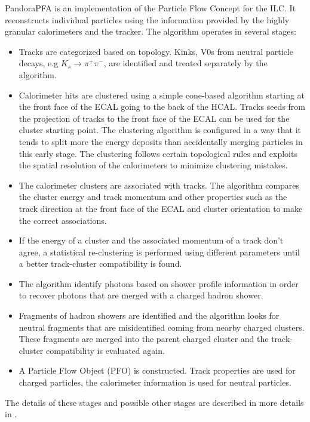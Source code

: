 PandoraPFA \cite{Thomson:2009rp, Marshall2013} is an implementation of the Particle Flow Concept for the ILC. It reconstructs individual particles using the information provided by the highly granular calorimeters and the tracker. The algorithm operates in several stages:
\begin{itemize}
  \item Tracks are categorized based on topology. Kinks, V0s from neutral particle decays, e.g $K_s \rightarrow \pi^+\pi^-$, are identified and treated separately by the algorithm.
  \item Calorimeter hits are clustered using a simple cone-based algorithm starting at the front face of the ECAL going to the back of the HCAL. Tracks seeds from the projection of tracks to the front face of the ECAL can be used for the cluster starting point. The clustering algorithm is configured in a way that it tends to split more the energy deposits than accidentally merging particles in this early stage. The clustering follows certain topological rules and exploits the spatial resolution of the calorimeters to minimize clustering mistakes.
  \item The calorimeter clusters are associated with tracks. The algorithm compares the cluster energy and track momentum and other properties such as the track direction at the front face of the ECAL and cluster orientation to make the correct associations.
  \item If the energy of a cluster and the associated momentum of a track don't agree, a statistical re-clustering is performed using different parameters until a better track-cluster compatibility is found.
  \item The algorithm identify photons based on shower profile information in order to recover photons that are merged with a charged hadron shower.
  \item Fragments of hadron showers are identified and the algorithm looks for neutral fragments that are misidentified coming from nearby charged clusters. These fragments are merged into the parent charged cluster and the track-cluster compatibility is evaluated again.
  \item A Particle Flow Object (PFO) is constructed. Track properties are used for charged particles, the calorimeter information is used for neutral particles.
\end{itemize}
The details of these stages and possible other stages are described in more details in \cite{Thomson:2009rp}.


